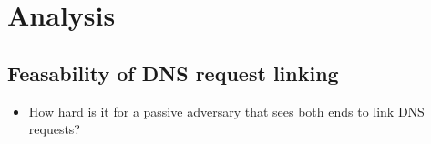 \section{Analysis}
\label{sec:analysis}

\subsection{Feasability of DNS request linking}
\begin{itemize}
	\item How hard is it for a passive adversary that sees both ends to link DNS
		requests?
\end{itemize}
